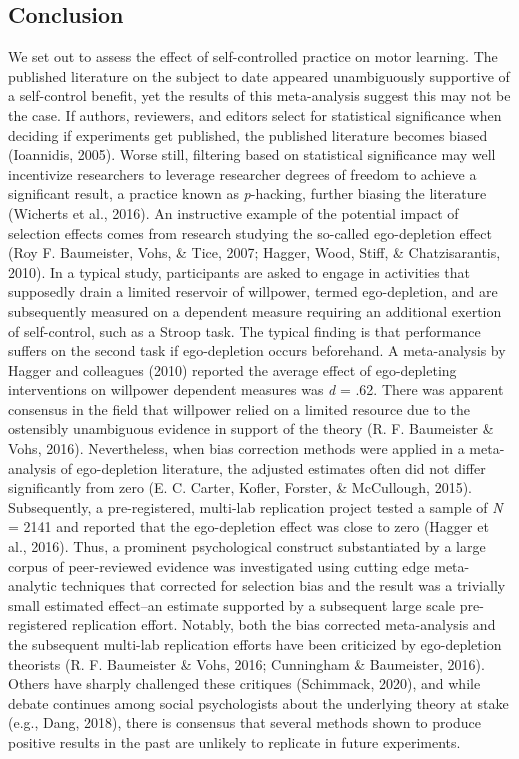 \documentclass[
  english,
  man,floatsintext]{apa7}
\begin{document}
\hypertarget{conclusion}{%
\subsection{Conclusion}\label{conclusion}}

We set out to assess the effect of self-controlled practice on motor learning. The published literature on the subject to date appeared unambiguously supportive of a self-control benefit, yet the results of this meta-analysis suggest this may not be the case. If authors, reviewers, and editors select for statistical significance when deciding if experiments get published, the published literature becomes biased (Ioannidis, 2005). Worse still, filtering based on statistical significance may well incentivize researchers to leverage researcher degrees of freedom to achieve a significant result, a practice known as \emph{p}-hacking, further biasing the literature (Wicherts et al., 2016). An instructive example of the potential impact of selection effects comes from research studying the so-called ego-depletion effect (Roy F. Baumeister, Vohs, \& Tice, 2007; Hagger, Wood, Stiff, \& Chatzisarantis, 2010). In a typical study, participants are asked to engage in activities that supposedly drain a limited reservoir of willpower, termed ego-depletion, and are subsequently measured on a dependent measure requiring an additional exertion of self-control, such as a Stroop task. The typical finding is that performance suffers on the second task if ego-depletion occurs beforehand. A meta-analysis by Hagger and colleagues (2010) reported the average effect of ego-depleting interventions on willpower dependent measures was \emph{d} = .62. There was apparent consensus in the field that willpower relied on a limited resource due to the ostensibly unambiguous evidence in support of the theory (R. F. Baumeister \& Vohs, 2016). Nevertheless, when bias correction methods were applied in a meta-analysis of ego-depletion literature, the adjusted estimates often did not differ significantly from zero (E. C. Carter, Kofler, Forster, \& McCullough, 2015). Subsequently, a pre-registered, multi-lab replication project tested a sample of \emph{N} = 2141 and reported that the ego-depletion effect was close to zero (Hagger et al., 2016). Thus, a prominent psychological construct substantiated by a large corpus of peer-reviewed evidence was investigated using cutting edge meta-analytic techniques that corrected for selection bias and the result was a trivially small estimated effect--an estimate supported by a subsequent large scale pre-registered replication effort. Notably, both the bias corrected meta-analysis and the subsequent multi-lab replication efforts have been criticized by ego-depletion theorists (R. F. Baumeister \& Vohs, 2016; Cunningham \& Baumeister, 2016). Others have sharply challenged these critiques (Schimmack, 2020), and while debate continues among social psychologists about the underlying theory at stake (e.g., Dang, 2018), there is consensus that several methods shown to produce positive results in the past are unlikely to replicate in future experiments.
\end{document}
